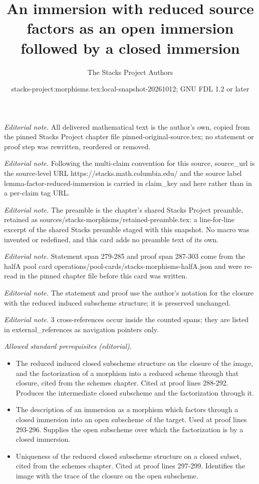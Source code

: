 \documentclass[10pt,a4paper]{amsart}
\title{An immersion with reduced source factors as an open immersion followed by a closed immersion}
\author{The Stacks Project Authors}
\date{stacks-project:morphisms.tex:local-snapshot-20261012; GNU FDL 1.2 or later}
\theoremstyle{plain}
\theoremstyle{definition}
\theoremstyle{remark}
\numberwithin{equation}{subsection}
\begin{document}
\maketitle
\noindent\textit{Editorial note.} All delivered mathematical text is the author's own, copied from the pinned Stacks Project chapter file pinned-original-source.tex; no statement or proof step was rewritten, reordered or removed.\par\medskip
\noindent\textit{Editorial note.} Following the multi-claim convention for this source, source\_url is the source-level URL https://stacks.math.columbia.edu/ and the source label lemma-factor-reduced-immersion is carried in claim\_key and here rather than in a per-claim tag URL.\par\medskip
\noindent\textit{Editorial note.} The preamble is the chapter's shared Stacks Project preamble, retained as sources/stacks-morphisms/retained-preamble.tex: a line-for-line excerpt of the shared Stacks preamble staged with this snapshot. No macro was invented or redefined, and this card adds no preamble text of its own.\par\medskip
\noindent\textit{Editorial note.} Statement span 279-285 and proof span 287-303 come from the halfA pool card operations/pool-cards/stacks-morphisms-halfA.json and were re-read in the pinned chapter file before this card was written.\par\medskip
\noindent\textit{Editorial note.} The statement and proof use the author's notation for the closure with the reduced induced subscheme structure; it is preserved unchanged.\par\medskip
\noindent\textit{Editorial note.} 3 cross-references occur inside the counted spans; they are listed in external\_references as navigation pointers only.\par\medskip
\noindent\textit{Allowed standard prerequisites (editorial).}\begin{itemize}
\item The reduced induced closed subscheme structure on the closure of the image, and the factorization of a morphism into a reduced scheme through that closure, cited from the schemes chapter. Cited at proof lines 288-292. Produces the intermediate closed subscheme and the factorization through it.
\item The description of an immersion as a morphism which factors through a closed immersion into an open subscheme of the target. Used at proof lines 293-296. Supplies the open subscheme over which the factorization is by a closed immersion.
\item Uniqueness of the reduced closed subscheme structure on a closed subset, cited from the schemes chapter. Cited at proof lines 297-299. Identifies the image with the trace of the closure on the open subscheme.
\end{itemize}\medskip
\end{document}
